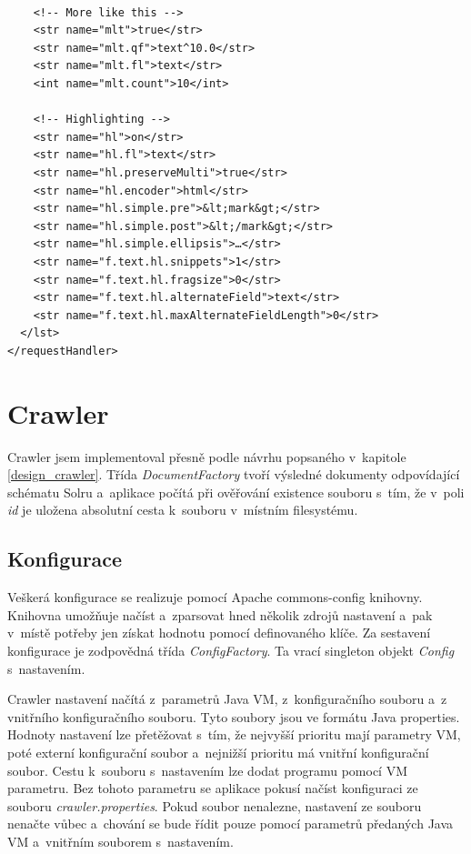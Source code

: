 \begin{verbatim}
    
    <!-- More like this -->
    <str name="mlt">true</str>
    <str name="mlt.qf">text^10.0</str>
    <str name="mlt.fl">text</str>
    <int name="mlt.count">10</int>
    
    <!-- Highlighting -->
    <str name="hl">on</str>
    <str name="hl.fl">text</str>
    <str name="hl.preserveMulti">true</str>
    <str name="hl.encoder">html</str>
    <str name="hl.simple.pre">&lt;mark&gt;</str>
    <str name="hl.simple.post">&lt;/mark&gt;</str>
    <str name="hl.simple.ellipsis">…</str>
    <str name="f.text.hl.snippets">1</str>
    <str name="f.text.hl.fragsize">0</str>
    <str name="f.text.hl.alternateField">text</str>
    <str name="f.text.hl.maxAlternateFieldLength">0</str>
  </lst>
</requestHandler>
\end{verbatim}

\section{Crawler}
Crawler jsem implementoval přesně podle návrhu popsaného v~kapitole \ref{design_crawler}. Třída \emph{DocumentFactory} tvoří výsledné dokumenty odpovídající schématu Solru a~aplikace počítá při ověřování existence souboru s~tím, že v~poli \emph{id} je uložena absolutní cesta k~souboru v~místním filesystému.

\subsection{Konfigurace}
Veškerá konfigurace se realizuje pomocí Apache commons-config knihovny. Knihovna umožňuje načíst a~zparsovat hned několik zdrojů nastavení a~pak v~místě potřeby jen získat hodnotu pomocí definovaného klíče. Za sestavení konfigurace je zodpovědná třída \emph{ConfigFactory}. Ta vrací singleton objekt \emph{Config} s~nastavením.

Crawler nastavení načítá z~parametrů Java VM, z~konfiguračního souboru a~z vnitřního konfiguračního souboru. Tyto soubory jsou ve formátu Java properties. Hodnoty nastavení lze přetěžovat s~tím, že nejvyšší prioritu mají parametry VM, poté externí konfigurační soubor a~nejnižší prioritu má vnitřní konfigurační soubor. Cestu k~souboru s~nastavením lze dodat programu pomocí VM parametru. Bez tohoto parametru se aplikace pokusí načíst konfiguraci ze souboru \emph{crawler.properties}. Pokud soubor nenalezne, nastavení ze souboru nenačte vůbec a~chování se bude řídit pouze pomocí parametrů předaných Java VM a~vnitřním souborem s~nastavením.

